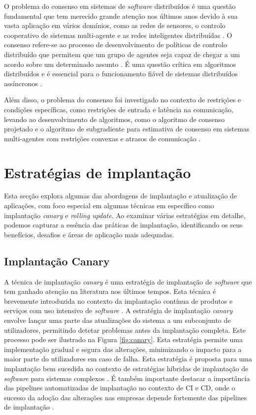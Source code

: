 O problema do consenso em sistemas de \textit{software} distribuídos é uma questão fundamental que 
tem merecido grande atenção nos últimos anos devido à sua vasta aplicação em vários domínios, como
as redes de sensores, o controlo cooperativo de sistemas multi-agente e as redes inteligentes 
distribuídas \cite{consensus2020}. O consenso refere-se ao processo de desenvolvimento de políticas 
de controlo distribuído que permitem que um grupo de agentes seja capaz de chegar a um acordo sobre 
um determinado assunto \cite{consensus2013}. É uma questão crítica em algoritmos distribuídos e é
essencial para o funcionamento fiável de sistemas distribuídos assíncronos \cite{consesus2016} 
\cite{consensus2011}.

Além disso, o problema do consenso foi investigado no contexto de restrições e condições
específicas, como restrições de entrada e latência na comunicação, levando ao desenvolvimento de
algoritmos, como o algoritmo de consenso projetado e o algoritmo de subgradiente para estimativa 
de consenso em sistemas multi-agentes com restrições convexas e atrasos de comunicação 
\cite{consensus2018}.

\section{Estratégias de implantação}

Esta secção explora algumas das abordagens de implantação e atualização de aplicações, com foco 
especial em algumas técnicas em específico como implantação \textit{canary} e \textit{rolling update}.
Ao examinar várias estratégias em detalhe, podemos capturar a essência das práticas de implantação, 
identificando os seus benefícios, desafios e áreas de aplicação mais adequadas. 

\subsection{Implantação Canary}

A técnica de implantação \textit{canary} é uma estratégia de implantação de \textit{software} que 
tem ganhado atenção na literatura nos últimos tempos. Esta técnica é brevemente introduzida no 
contexto da implantação contínua de produtos e serviços com uso intensivo de \textit{software} \cite{canary2017}. 
A estratégia de implantação \textit{canary} envolve lançar uma parte das atualizações do sistema a 
um subconjunto de utilizadores, permitindo detetar problemas antes da implantação completa.
Este processo pode ser ilustrado na Figura \ref{fig:canary}. Esta estratégia permite uma 
implementação gradual e segura das alterações, minimizando o impacto para a maior parte do 
utilizadores em caso de falha. Esta estratégia é proposta para uma implantação bem sucedida no 
contexto de estratégias híbridas de implantação de \textit{software} para sistemas complexos 
\cite{canary2022}. É também importante destacar a importância das \glspl{pipeline} automatizadas 
de implantação no contexto de \ac{CI} e \ac{CD}, onde o sucesso da adoção das alterações nas 
empresas depende fortemente das \glspl{pipeline} de implantação \cite{canary2017b}. 


